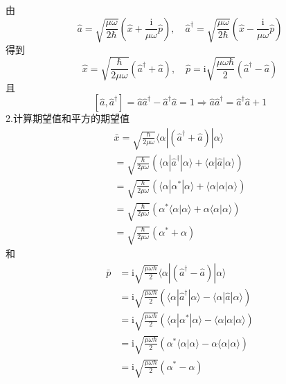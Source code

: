 由
\begin{equation}
    \hat{a}=\sqrt{\frac{\mu \omega}{2\hbar}}\left( \hat{x}+\frac{\mathrm{i}}{\mu \omega}\hat{p} \right) ,\quad \hat{a}^{\dagger}=\sqrt{\frac{\mu \omega}{2\hbar}}\left( \hat{x}-\frac{\mathrm{i}}{\mu \omega}\hat{p} \right) 
\end{equation}
得到
\begin{equation}
    \hat{x}=\sqrt{\frac{\hbar}{2\mu \omega}}\left( \hat{a}^{\dagger}+\hat{a} \right) ,\quad \hat{p}=\mathrm{i}\sqrt{\frac{\mu \omega \hbar}{2}}\left( \hat{a}^{\dagger}-\hat{a} \right) 
\end{equation}
且
\begin{equation}
    \left[ \hat{a},\hat{a}^{\dagger} \right] =\hat{a}\hat{a}^{\dagger}-\hat{a}^{\dagger}\hat{a}=1\Rightarrow \hat{a}\hat{a}^{\dagger}=\hat{a}^{\dagger}\hat{a}+1
\end{equation}
2.计算期望值和平方的期望值
\begin{equation}
    \begin{aligned}
        \bar{x}=\sqrt{\frac{\hbar}{2\mu \omega}}\langle \alpha |\left( \hat{a}^{\dagger}+\hat{a} \right) |\alpha \rangle 
\\
=\sqrt{\frac{\hbar}{2\mu \omega}}\left( \langle \alpha |\hat{a}^{\dagger}|\alpha \rangle +\langle \alpha |\hat{a}|\alpha \rangle \right) 
\\
=\sqrt{\frac{\hbar}{2\mu \omega}}\left( \langle \alpha |\alpha ^*|\alpha \rangle +\langle \alpha |\alpha |\alpha \rangle \right) 
\\
=\sqrt{\frac{\hbar}{2\mu \omega}}\left( \alpha ^*\langle \alpha |\alpha \rangle +\alpha \langle \alpha |\alpha \rangle \right) 
\\
=\sqrt{\frac{\hbar}{2\mu \omega}}\left( \alpha ^*+\alpha \right) 
    \end{aligned}
\end{equation}
和
\begin{equation}
    \begin{aligned}
        \bar{p}&=\mathrm{i}\sqrt{\frac{\mu \omega \hbar}{2}}\langle \alpha |\left( \hat{a}^{\dagger}-\hat{a} \right) |\alpha \rangle 
\\
&=\mathrm{i}\sqrt{\frac{\mu \omega \hbar}{2}}\left( \langle \alpha |\hat{a}^{\dagger}|\alpha \rangle -\langle \alpha |\hat{a}|\alpha \rangle \right) 
\\
&=\mathrm{i}\sqrt{\frac{\mu \omega \hbar}{2}}\left( \langle \alpha |\alpha ^*|\alpha \rangle -\langle \alpha |\alpha |\alpha \rangle \right) 
\\
&=\mathrm{i}\sqrt{\frac{\mu \omega \hbar}{2}}\left( \alpha ^*\langle \alpha |\alpha \rangle -\alpha \langle \alpha |\alpha \rangle \right) 
\\
&=\mathrm{i}\sqrt{\frac{\mu \omega \hbar}{2}}\left( \alpha ^*-\alpha \right) 
    \end{aligned}
\end{equation}

